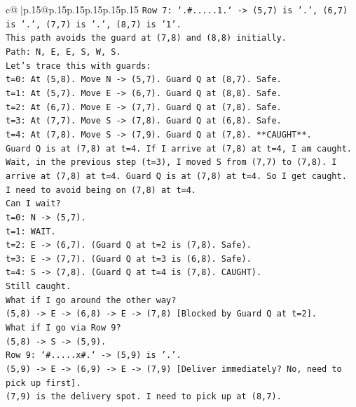 \documentclass{article}
\begin{document}
{\begin{supertabular}{c@{$\;$}|p{.15\linewidth}@{}p{.15\linewidth}p{.15\linewidth}p{.15\linewidth}p{.15\linewidth}p{.15\linewidth}}
{{{\texttt{Row 7: `.\#.....1.` {-}> (5,7) is '.', (6,7) is '.', (7,7) is '.', (8,7) is '1'.} \\
\texttt{This path avoids the guard at (7,8) and (8,8) initially.} \\
\texttt{Path: N, E, E, S, W, S.} \\
\texttt{Let's trace this with guards:} \\
\texttt{t=0: At (5,8). Move N {-}> (5,7). Guard Q at (8,7). Safe.} \\
\texttt{t=1: At (5,7). Move E {-}> (6,7). Guard Q at (8,8). Safe.} \\
\texttt{t=2: At (6,7). Move E {-}> (7,7). Guard Q at (7,8). Safe.} \\
\texttt{t=3: At (7,7). Move S {-}> (7,8). Guard Q at (6,8). Safe.} \\
\texttt{t=4: At (7,8). Move S {-}> (7,9). Guard Q at (7,8). **CAUGHT**.} \\
\texttt{Guard Q is at (7,8) at t=4. If I arrive at (7,8) at t=4, I am caught.} \\
\texttt{Wait, in the previous step (t=3), I moved S from (7,7) to (7,8). I arrive at (7,8) at t=4. Guard Q is at (7,8) at t=4. So I get caught.} \\
\texttt{I need to avoid being on (7,8) at t=4.} \\
\texttt{Can I wait?} \\
\texttt{t=0: N {-}> (5,7).} \\
\texttt{t=1: WAIT.} \\
\texttt{t=2: E {-}> (6,7). (Guard Q at t=2 is (7,8). Safe).} \\
\texttt{t=3: E {-}> (7,7). (Guard Q at t=3 is (6,8). Safe).} \\
\texttt{t=4: S {-}> (7,8). (Guard Q at t=4 is (7,8). CAUGHT).} \\
\texttt{Still caught.} \\
\texttt{What if I go around the other way?} \\
\texttt{(5,8) {-}> E {-}> (6,8) {-}> E {-}> (7,8) {[}Blocked by Guard Q at t=2{]}.} \\
\texttt{What if I go via Row 9?} \\
\texttt{(5,8) {-}> S {-}> (5,9).} \\
\texttt{Row 9: `\#.....x\#.` {-}> (5,9) is '.'.} \\
\texttt{(5,9) {-}> E {-}> (6,9) {-}> E {-}> (7,9) {[}Deliver immediately? No, need to pick up first{]}.} \\
\texttt{(7,9) is the delivery spot. I need to pick up at (8,7).} \\
}}}
\end{supertabular}}
\end{document}
